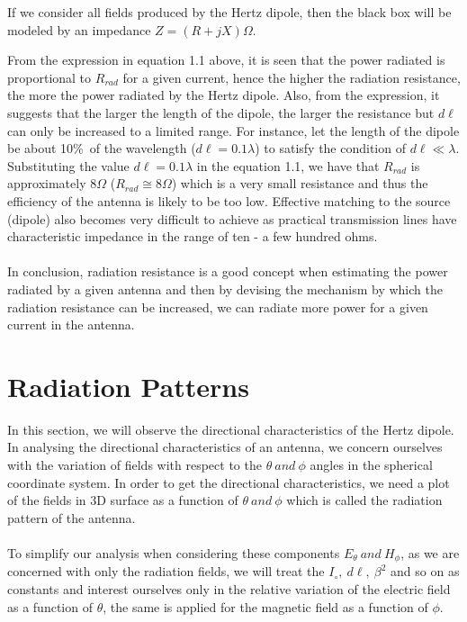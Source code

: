 If we consider all fields produced by the Hertz dipole, then the black box will be modeled by an impedance $Z = (R + jX)\Omega$. 

From the expression in equation 1.1 above, it is seen that the power radiated is proportional to $R_{rad}$ for a given current, hence the higher the radiation resistance, the more the power radiated by the Hertz dipole. Also, from the expression, it suggests that the larger the length of the dipole, the larger the resistance but $d\ell$ can only be increased to a limited range. For instance, let the length of the dipole be about 10\%\ of the wavelength ($d\ell = 0.1\lambda$) to satisfy the condition of $d\ell \ll \lambda$. Substituting the value $d\ell = 0.1\lambda$ in the equation 1.1, we have that $R_{rad}$ is approximately $8\Omega$ ($R_{rad} \cong 8\Omega$) which is a very small resistance and thus the efficiency of the antenna is likely to be too low. Effective matching to the source (dipole) also becomes very difficult to achieve as practical transmission lines have characteristic impedance in the range of ten - a few hundred ohms. 
 \paragraph{}
 In conclusion, radiation resistance is a good concept when estimating the power radiated by a given antenna and then by devising the mechanism by which the radiation resistance can be increased, we can radiate more power for a given current in the antenna. 
 
 \section{Radiation Patterns}
 In this section, we will observe the directional characteristics of the Hertz dipole. In analysing the directional characteristics of an antenna, we concern ourselves with the variation of fields with respect to the $\theta \ and \ \phi$ angles in the spherical coordinate system. In order to get the directional characteristics, we need a plot of the fields in 3D surface as a function of $\theta \ and \ \phi$ which is called the radiation pattern of the antenna. 
 
 \paragraph{}
 To simplify our analysis when considering these components $E_\theta \ and \ H_\phi$, as we are concerned with only the radiation fields, we will treat the $I_\circ, \ d\ell, \ \beta^2$ and so on as constants and interest ourselves only in the relative variation of the electric field as a function of $\theta$, the same is applied for the magnetic field as a function of $\phi$.


